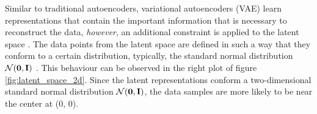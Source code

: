 Similar to traditional autoencoders, variational autoencoders (VAE) learn representations that contain the important information that is necessary to reconstruct the data, \textit{however}, an additional constraint is applied to the latent space \cite{doerschTutorialVariationalAutoencoders2021, davidfosterVariationalAutoencoders2023, kingmaAutoEncodingVariationalBayes2022, kingmaIntroductionVariationalAutoencoders2019, cinelliVariationalMethodsMachine2021}. The data points from the latent space are defined in such a way that they conform to a certain distribution, typically, the standard normal distribution $\mathcal{N}(\bm{\mathbf{0}}, \mathbf{I})$ \cite{davidfosterVariationalAutoencoders2023}. %
This behaviour can be observed in the right plot of figure \ref{fig:latent_space_2d}. Since the latent representations conform a two-dimensional standard normal distribution $\mathcal{N}(\bm{\mathbf{0}}, \mathbf{I})$, the data samples are more likely to be near the center at (0, 0).


%
%






